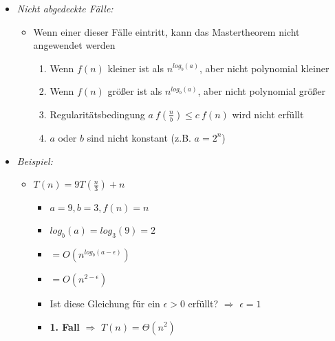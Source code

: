 \begin{itemize}
\begin{itemize}
                \item \textit{Nicht abgedeckte Fälle:}
                    \begin{itemize}
                        \item Wenn einer dieser Fälle eintritt, kann das Mastertheorem nicht angewendet werden
                            \begin{enumerate}
                                \item Wenn $f(n)$ kleiner ist als $n^{log_b(a)}$, aber nicht polynomial kleiner
                                \item Wenn $f(n)$ größer ist als $n^{log_b(a)}$, aber nicht polynomial größer
                                \item Regularitätsbedingung $a~f(\frac{n}{b}) \leq c~f(n)$ wird nicht erfüllt
                                \item $a$ oder $b$ sind nicht konstant (z.B. $a=2^n$)
                            \end{enumerate}
                    \end{itemize}

                \item \textit{Beispiel:}
                    \begin{itemize}
                        \item \textit{$T(n) = 9T(\frac{n}{3}) + n$}
                            \begin{itemize}
                                \item $a=9, b=3, f(n)=n$
                                \item $log_b(a) = log_3(9) = 2$
                                \item {} $= O(n^{log_b(a-\epsilon)})$
                                \item[] {\makebox[1.5cm][l]{}} $= O(n^{2-\epsilon})$
                                \item Ist diese Gleichung für ein $\epsilon > 0$ erfüllt? $\Rightarrow$ $\epsilon = 1$
                                \item \textbf{1. Fall} $\Rightarrow$ $T(n) = \Theta(n^2)$ 
                            \end{itemize}


\end{itemize}
\end{itemize}
\end{itemize}
